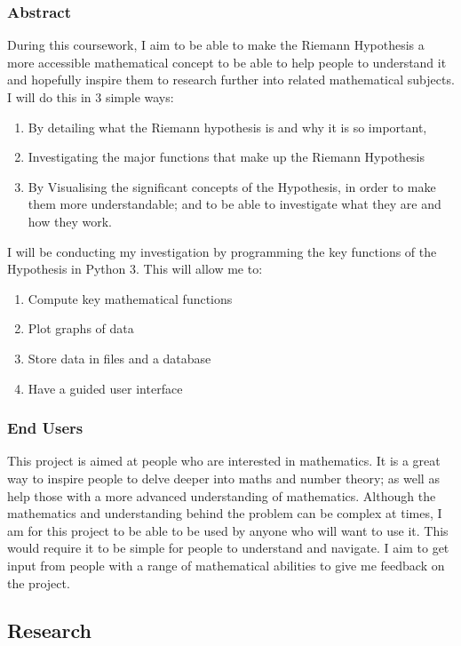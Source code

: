 \documentclass{article}
\begin{document}
\subsubsection{Abstract}

During this coursework, I aim to be able to make the Riemann Hypothesis a more accessible mathematical concept to be able to help people to understand it and hopefully inspire them to research further into related mathematical subjects. I will do this in 3 simple ways:
\begin{enumerate}
\item By detailing what the Riemann hypothesis is and why it is so important,
\item Investigating the major functions that make up the Riemann Hypothesis
\item By Visualising the significant concepts of the Hypothesis, in order to make them more understandable; and to be able to investigate what they are and how they work.
\end{enumerate}

I will be conducting my investigation by programming the key functions of the Hypothesis in Python 3. This will allow me to:
\begin{enumerate}
    \item Compute key mathematical functions
    \item Plot graphs of data
    \item Store data in files and a database
    \item Have a guided user interface
\end{enumerate}

\subsubsection{End Users}

This project is aimed at people who are interested in mathematics. It is a great way to inspire people to delve deeper into maths and number theory; as well as help those with a more advanced understanding of mathematics. Although the mathematics and understanding behind the problem can be complex at times, I am for this project to be able to be used by anyone who will want to use it. This would require it to be simple for people to understand and navigate. I aim to get input from people with a range of mathematical abilities to give me feedback on the project.


\subsection{Research}
\end{document}
